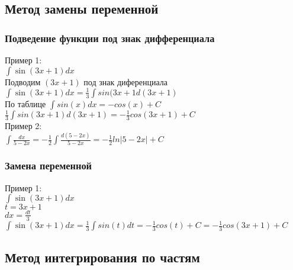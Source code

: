 \documentclass[12pt,a4paper]{article}
\begin{document}
\subsection{Метод замены переменной}
\subsubsection{Подведение функции под знак дифференциала}
Пример 1: \\
$ \int{\sin(3x + 1)dx} $ \\
Подводим $ (3x+1) $ под знак диференциала \\
$ \int{\sin(3x + 1)dx} = \frac{1}{3}\int{sin(3x+1}d(3x+1) $ \\
По таблице $ \int{sin(x)dx} = -cos(x) + C $ \\
$ \frac{1}{3}\int{sin(3x+1)d(3x+1)} = -\frac{1}{3}cos(3x+1) + C $
\\
Пример 2: \\
$ \int{\frac{dx}{5 - 2x}} = -\frac{1}{2}\int{\frac{d(5-2x)}{5 - 2x}}
= -\frac{1}{2}ln|5-2x|+C $

\subsubsection{Замена переменной}
Пример 1: \\
$ \int{\sin(3x + 1)dx} $ \\
$ t = 3x + 1 $ \\
$ dx = \frac{dt}{3} $ \\
$ \int{\sin(3x + 1)dx} = \frac{1}{3}\int{sin(t)dt} = -\frac{1}{3}cos(t) + C = -\frac{1}{3}cos(3x+1) + C $ 

\subsection{Метод интегрирования по частям}
\end{document}

